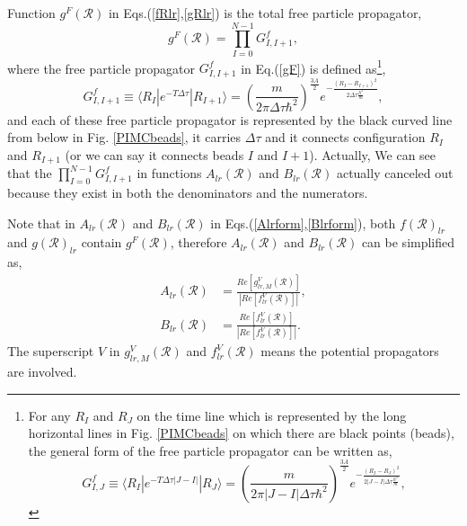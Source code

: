 \documentclass[12pt,letterpaper,UTF8]{report}
\begin{document}
Function $g^F(\mathcal{R})$ in Eqs.(\ref{fRlr},\ref{gRlr}) is the total free particle propagator,
\begin{equation}
g^F(\mathcal{R}) = \prod_{I=0}^{N-1} G^f_{I, I+1} ,
\label{gF}
\end{equation}
where the free particle propagator $G^f_{I, I+1}$ in Eq.(\ref{gF}) is defined as\footnote{
For any $R_I$ and $R_J$ on the time line which is represented by the long horizontal lines in Fig. \ref{PIMCbeads} on which there are black points (beads), the general form of the free particle propagator can be written as,
\begin{equation}
G^f_{I, J} \equiv \langle R_I | e^{-T \Delta \tau |J-I| }  | R_{J} \rangle
= \left( \frac{m}{2\pi |J-I| \Delta \tau \hbar^2} \right)^{\frac{3A}{2}}
e^{  -\frac{ (R_I-R_{J})^2 }{2 |J-I| \Delta \tau \frac{\hbar^2}{m}}  },
\label{Gfij}
\end{equation}},
\begin{equation}
G^f_{I, I+1} \equiv \langle R_I | e^{-T \Delta \tau}  | R_{I+1} \rangle
= \left( \frac{m}{2\pi \Delta \tau \hbar^2} \right)^{\frac{3A}{2}}   e^{  -\frac{ (R_I-R_{I+1})^2 }{2 \Delta \tau \frac{\hbar^2}{m}}  },
\label{Gfii1}
\end{equation}
and each of these free particle propagator is represented by the black curved line from below in Fig. \ref{PIMCbeads}, it carries $\Delta \tau$ and it connects configuration $R_I$ and $R_{I+1}$ (or we can say it connects beads $I$ and $I+1$).
Actually, We can see that the $\prod_{I=0}^{N-1}  G^f_{I, I+1}$ in functions $A_{lr} (\mathcal{R})$ and $B_{lr} (\mathcal{R})$ actually canceled out because they exist in both the denominators and the numerators.

Note that in $A_{lr} (\mathcal{R})$ and $B_{lr} (\mathcal{R})$ in Eqs.(\ref{Alrform},\ref{Blrform}), both $f(\mathcal{R})_{lr} $ and $g(\mathcal{R})_{lr} $ contain $g^F(\mathcal{R})$,
therefore $A_{lr} (\mathcal{R})$ and $B_{lr} (\mathcal{R})$ can be simplified as,
\begin{align}
A_{lr} (\mathcal{R}) &= \frac{Re[ g^V_{lr,M}(\mathcal{R})]}{|Re[ f^V_{lr}(\mathcal{R})]|  } ,
\label{Alrsimpform} \\
B_{lr} (\mathcal{R}) &= \frac{Re[ f^V_{lr}(\mathcal{R})]}{|Re[ f^V_{lr}(\mathcal{R})]|  } .
\label{Blrsimpform}
\end{align}
The superscript $V$ in $g^V_{lr,M}(\mathcal{R})$ and $f^V_{lr}(\mathcal{R})$ means the potential propagators are involved.
\end{document}
